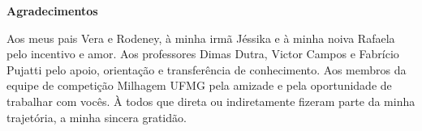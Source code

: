 
\begin{center}
\huge{{\bf Agradecimentos}}
\vspace{4cm}
\end{center}

Aos meus pais Vera e Rodeney, à minha irmã Jéssika e à minha noiva Rafaela pelo incentivo e amor. Aos professores Dimas Dutra, Victor Campos e Fabrício Pujatti pelo
apoio, orientação e transferência de conhecimento. Aos membros da equipe de competição Milhagem UFMG pela amizade e pela oportunidade de trabalhar com vocês. À todos que direta
ou indiretamente fizeram parte da minha trajetória, a minha sincera gratidão.
 
\clearpage
\thispagestyle{empty}
\cleardoublepage